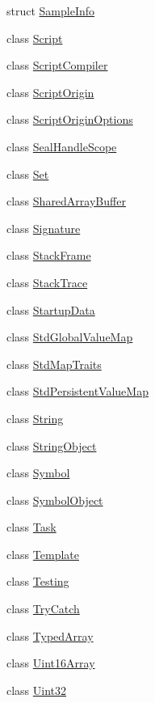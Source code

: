 \begin{DoxyCompactItemize}
struct \hyperlink{structv8_1_1SampleInfo}{Sample\+Info}
\item 
class \hyperlink{classv8_1_1Script}{Script}
\item 
class \hyperlink{classv8_1_1ScriptCompiler}{Script\+Compiler}
\item 
class \hyperlink{classv8_1_1ScriptOrigin}{Script\+Origin}
\item 
class \hyperlink{classv8_1_1ScriptOriginOptions}{Script\+Origin\+Options}
\item 
class \hyperlink{classv8_1_1SealHandleScope}{Seal\+Handle\+Scope}
\item 
class \hyperlink{classv8_1_1Set}{Set}
\item 
class \hyperlink{classv8_1_1SharedArrayBuffer}{Shared\+Array\+Buffer}
\item 
class \hyperlink{classv8_1_1Signature}{Signature}
\item 
class \hyperlink{classv8_1_1StackFrame}{Stack\+Frame}
\item 
class \hyperlink{classv8_1_1StackTrace}{Stack\+Trace}
\item 
class \hyperlink{classv8_1_1StartupData}{Startup\+Data}
\item 
class \hyperlink{classv8_1_1StdGlobalValueMap}{Std\+Global\+Value\+Map}
\item 
class \hyperlink{classv8_1_1StdMapTraits}{Std\+Map\+Traits}
\item 
class \hyperlink{classv8_1_1StdPersistentValueMap}{Std\+Persistent\+Value\+Map}
\item 
class \hyperlink{classv8_1_1String}{String}
\item 
class \hyperlink{classv8_1_1StringObject}{String\+Object}
\item 
class \hyperlink{classv8_1_1Symbol}{Symbol}
\item 
class \hyperlink{classv8_1_1SymbolObject}{Symbol\+Object}
\item 
class \hyperlink{classv8_1_1Task}{Task}
\item 
class \hyperlink{classv8_1_1Template}{Template}
\item 
class \hyperlink{classv8_1_1Testing}{Testing}
\item 
class \hyperlink{classv8_1_1TryCatch}{Try\+Catch}
\item 
class \hyperlink{classv8_1_1TypedArray}{Typed\+Array}
\item 
class \hyperlink{classv8_1_1Uint16Array}{Uint16\+Array}
\item 
class \hyperlink{classv8_1_1Uint32}{Uint32}

\end{DoxyCompactItemize}
